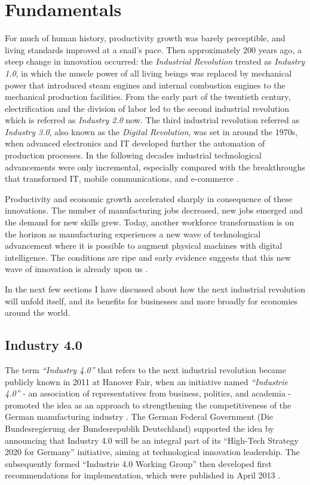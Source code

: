 \chapter{Fundamentals} \label{chap:fundamentals}
For much of human history, productivity growth was barely perceptible, and living standards improved at a snail's pace. Then approximately 200 years ago, a steep change in innovation occurred: the \textit{Industrial Revolution} treated as \textit{Industry 1.0}, in which the muscle power of all living beings was replaced by mechanical power that introduced steam engines and internal combustion engines to the mechanical production facilities. From the early part of the twentieth century, electrification and the division of labor led to the second industrial revolution which is referred as \textit{Industry 2.0} now. The third industrial revolution referred as \textit{Industry 3.0}, also known as the \textit{Digital Revolution}, was set in around the 1970s, when advanced electronics and \acs{IT} developed further the automation of production processes. In the following decades industrial technological advancements were only incremental, especially compared with the breakthroughs that transformed \acs{IT}, mobile communications, and e-commerce \cite{INDUSINTERNET,IN4DESIGN,IN4BCG}.

Productivity and economic growth accelerated sharply in consequence of these innovations. The number of manufacturing jobs decreased, new jobs emerged and the demand for new skills grew. Today, another workforce transformation is on the horizon as manufacturing experiences a new wave of technological advancement where it is possible to augment physical machines with digital intelligence. The conditions are ripe and early evidence suggests that this new wave of innovation is already upon us \cite{INDUSINTERNET,MANMACHINE}.

In the next few sections I have discussed about how the next industrial revolution will unfold itself, and its benefits for businesses and more broadly for economies around the world.
\section{Industry 4.0} \label{ind4}
The term \textit{“Industry 4.0”} that refers to the next industrial revolution became publicly known in 2011 at Hanover Fair, when an initiative named \textit{“Industrie 4.0”} - an association of representatives from business, politics, and academia - promoted the idea as an approach to strengthening the competitiveness of the German manufacturing industry \cite{VDINACH}. The German Federal Government (Die Bundesregierung der Bundesrepublik Deutschland) supported the idea by announcing that Industry 4.0 will be an integral part of its “High-Tech Strategy 2020 for Germany” initiative, aiming at technological innovation leadership. The subsequently formed “Industrie 4.0 Working Group” then developed first recommendations for implementation, which were published in April 2013 \cite{IN4DESIGN}.

